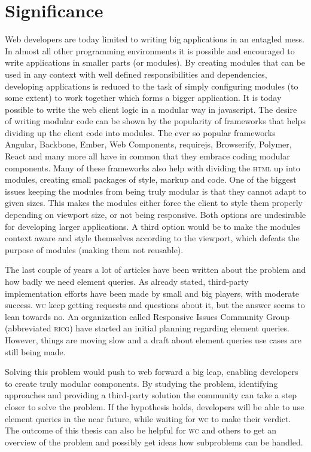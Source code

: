 \documentclass[oneside,a4paper,11pt]{kth-mag}
\begin{document}
\section*{Significance}
Web developers are today limited to writing big applications in an entagled mess. In almost all other programming environments it is possible and encouraged to write applications in smaller parts (or modules). By creating modules that can be used in any context with well defined responsibilities and dependencies, developing applications is reduced to the task of simply configuring modules (to some extent) to work together which forms a bigger application. It is today possible to write the web client logic in a modular way in javascript. The desire of writing modular code can be shown by the popularity of frameworks that helps dividing up the client code into modules. The ever so popular frameworks Angular, Backbone, Ember, Web Components, requirejs, Browserify, Polymer, React and many more all have in common that they embrace coding modular components. Many of these frameworks also help with dividing the \textsc{html} up into modules, creating small packages of style, markup and code. One of the biggest issues keeping the modules from being truly modular is that they cannot adapt to given sizes. This makes the modules either force the client to style them properly depending on viewport size, or not being responsive. Both options are undesirable for developing larger applications. A third option would be to make the modules context aware and style themselves according to the viewport, which defeats the purpose of modules (making them not reusable).

The last couple of years a lot of articles have been written about the problem and how badly we need element queries. As already stated, third-party implementation efforts have been made by small and big players, with moderate success. \textsc{w}\textsc{c} keep getting requests and questions about it, but the answer seems to lean towards no. An organization called Responsive Issues Community Group (abbreviated \textsc{ricg}) have started an initial planning regarding element queries. However, things are moving slow and a draft about element queries use cases are still being made.

Solving this problem would push to web forward a big leap, enabling developers to create truly modular components. By studying the problem, identifying approaches and providing a third-party solution the community can take a step closer to solve the problem. If the hypothesis holds, developers will be able to use element queries in the near future, while waiting for \textsc{w}\textsc{c} to make their verdict. The outcome of this thesis can also be helpful for \textsc{w}\textsc{c} and others to get an overview of the problem and possibly get ideas how subproblems can be handled.
\end{document}
